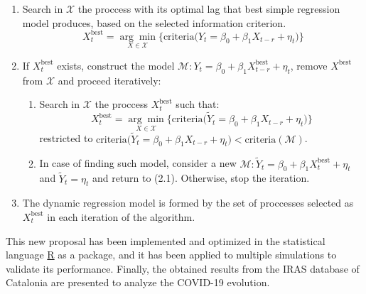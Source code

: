 \documentclass[12pt, a4paper, twoside]{article}
\begin{document}
\begin{enumerate}
    \item Search in $\mathcal{X}$ the proccess with its optimal lag that best simple regression model produces, based on the selected information criterion.
    \[ X^{\text{best}}_t = \underset{X\in\mathcal{X}}{\arg\min} \Big\{ \text{criteria}\big( Y_t = \beta_0 + \beta_1 X_{t-r} + \eta_t\big)\Big\} \] 
    \item If $X^{\text{best}}_t$ exists, construct the model $\mathcal{M}: Y_t = \beta_0 + \beta_1 X^{\text{best}}_{t-r} + \eta_t$, remove  $X^{\text{best}}$ from $\mathcal{X}$ and proceed iteratively:
    \begin{enumerate}[label*=\arabic*.]
        \item Search in $\mathcal{X}$ the proccess  $X^{\text{best}}_t$ such that:
        \[ X^{\text{best}}_t = \underset{X\in\mathcal{X}}{\arg\min} \Big\{ \text{criteria}\big( \tilde{Y}_t = \beta_0 + \beta_1 X_{t-r} + \eta_t\big)\Big\} \] 
        restricted to $\text{criteria}\big(\tilde{Y}_t = \beta_0 + \beta_1 X_{t-r} + \eta_t\big) < \text{criteria}(\mathcal{M})$.
        \item In case of finding such model, consider a new $\mathcal{M}: \tilde{Y}_t = \beta_0 + \beta_1 X^{\text{best}}_t + \eta_t$ and $\tilde{Y}_t = \eta_t$ and return to (2.1). Otherwise, stop the iteration.
    \end{enumerate}
    \item The dynamic regression model is formed by the set of proccesses selected as $X^{\text{best}}_t$ in each iteration of the algorithm.

\end{enumerate}

This new proposal has been implemented and optimized in the statistical language \href{https://www.r-project.org/}{R} as a package, and it has been applied to multiple simulations to validate its performance. Finally, the obtained results from the IRAS database of Catalonia are presented to analyze the COVID-19 evolution.



\end{document}
